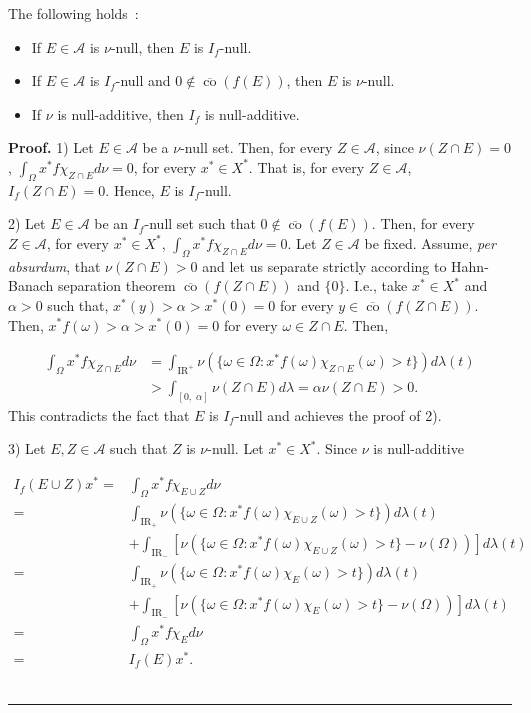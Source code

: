 \documentclass[10pt,a4paper]{amsart}
\renewcommand{\AA}{{\mathcal A}}
\newcommand{\IR}{{\mathrm{I\!R}}}
\newcommand{\cob}{\overline{\mathop{\mathrm{co}}}}
\newenvironment{proof}[1][Proof]{\textbf{#1.} }{\ \rule{0.5em}{0.5em}}
\begin{document}
\begin{proposition} The following holds~:
\begin{itemize}
\item[1)]If $E\in \AA$ is $\nu$-null, then $E$ is $I_f$-null. 
\item[2)]If $E\in \AA$ is $I_f$-null and $0\notin \cob(f(E))$, then $E$ is $\nu$-null.
\item[3)]If $\nu$ is null-additive, then $I_f$ is null-additive. 

\end{itemize}
\end{proposition}

\begin{proof}
1) Let $E\in \AA$ be a $\nu$-null set. Then, for every $Z\in \AA$, since $\nu(Z\cap E)=0$,  $\int_\Omega x^*f \chi_{Z\cap E} d\nu =0$, for every $x^*\in X^*$. That is, for every $Z\in \AA$, $I_f(Z\cap E)=0$. Hence, $E$ is $I_f$-null.

2) Let $E\in \AA$ be an $I_f$-null set such that $0\notin \cob(f(E))$. Then, for every $Z\in \AA$, for every $x^*\in X^*$, $\int_\Omega x^* f \chi_{Z\cap E} d\nu=0$. Let $Z\in \AA$ be fixed. Assume, \emph{per absurdum}, that $\nu(Z\cap E)>0$ and let us separate strictly according to Hahn-Banach separation theorem $\cob (f(Z\cap E))$ and $\{0\}$. I.e., take $x^*\in X^*$ and $\alpha>0$ such that, $x^*(y)>\alpha>x^*(0)=0$ for every $y\in \cob(f(Z\cap E))$. Then,  $x^*f(\omega)>\alpha>x^*(0)=0$ for every $\omega\in Z\cap E$. Then, 

$$
\begin{array}{rl}
\int_\Omega x^* f \chi_{Z\cap E} d\nu& =\int_{\IR^+} \nu(\{\omega \in \Omega : x^*f(\omega)\chi_{Z\cap E}(\omega)>t\}) d\lambda(t)\\
&>\int_{[0,\; \alpha]} \nu(Z\cap E)d\lambda=\alpha\nu(Z\cap E)>0.
\end{array}
$$ 
This contradicts the fact that $E$ is $I_f$-null and achieves the proof of 2).


3)  Let $E,Z\in \AA$ such that $Z$ is $\nu$-null. Let $x^*\in X^*$. Since $\nu$ is null-additive

$$
\begin{array}{rl}
I_f(E\cup Z)x^*=&\int_\Omega x^*f \chi_{E\cup Z} d\nu\\
=&\int_{\IR_+} \nu(\{\omega \in \Omega : x^*f (\omega) \chi_{E\cup Z}(\omega)>t\})d\lambda(t)\\
& +\int_{\IR_-} [\nu(\{\omega \in \Omega : x^*f (\omega)\chi_{E\cup Z}(\omega)>t\}-\nu(\Omega))]d\lambda(t)\\
=&\int_{\IR_+} \nu(\{\omega \in \Omega  : x^*f (\omega)\chi_{E}(\omega)>t\})d\lambda(t) \\
&+ \int_{\IR_-} [\nu(\{\omega \in \Omega : x^*f (\omega)\chi_{E}(\omega)>t\}-\nu(\Omega))]d\lambda(t)\\
=&\int_\Omega x^*f \chi_E d\nu\\
=&I_f(E)x^*.
\end{array}
$$
\end{proof}
\end{document}
